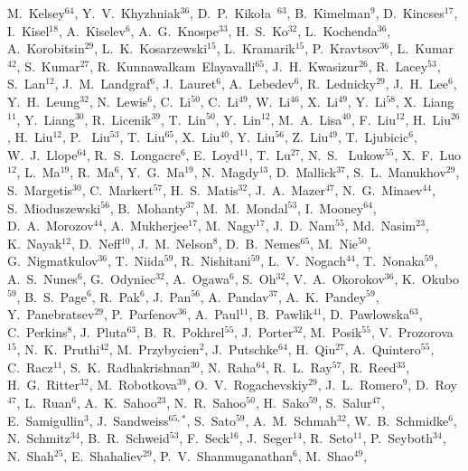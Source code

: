 {M.~Kelsey$^{64}$,
Y.~V.~Khyzhniak$^{36}$,
D.~P.~Kiko\l{}a~$^{63}$,
B.~Kimelman$^{9}$,
D.~Kincses$^{17}$,
I.~Kisel$^{18}$,
A.~Kiselev$^{6}$,
A.~G.~Knospe$^{33}$,
H.~S.~Ko$^{32}$,
L.~Kochenda$^{36}$,
A.~Korobitsin$^{29}$,
L.~K.~Kosarzewski$^{15}$,
L.~Kramarik$^{15}$,
P.~Kravtsov$^{36}$,
L.~Kumar$^{42}$,
S.~Kumar$^{27}$,
R.~Kunnawalkam~Elayavalli$^{65}$,
J.~H.~Kwasizur$^{26}$,
R.~Lacey$^{53}$,
S.~Lan$^{12}$,
J.~M.~Landgraf$^{6}$,
J.~Lauret$^{6}$,
A.~Lebedev$^{6}$,
R.~Lednicky$^{29}$,
J.~H.~Lee$^{6}$,
Y.~H.~Leung$^{32}$,
N.~Lewis$^{6}$,
C.~Li$^{50}$,
C.~Li$^{49}$,
W.~Li$^{46}$,
X.~Li$^{49}$,
Y.~Li$^{58}$,
X.~Liang$^{11}$,
Y.~Liang$^{30}$,
R.~Licenik$^{39}$,
T.~Lin$^{50}$,
Y.~Lin$^{12}$,
M.~A.~Lisa$^{40}$,
F.~Liu$^{12}$,
H.~Liu$^{26}$,
H.~Liu$^{12}$,
P.~ Liu$^{53}$,
T.~Liu$^{65}$,
X.~Liu$^{40}$,
Y.~Liu$^{56}$,
Z.~Liu$^{49}$,
T.~Ljubicic$^{6}$,
W.~J.~Llope$^{64}$,
R.~S.~Longacre$^{6}$,
E.~Loyd$^{11}$,
T.~Lu$^{27}$,
N.~S.~ Lukow$^{55}$,
X.~F.~Luo$^{12}$,
L.~Ma$^{19}$,
R.~Ma$^{6}$,
Y.~G.~Ma$^{19}$,
N.~Magdy$^{13}$,
D.~Mallick$^{37}$,
S.~L.~Manukhov$^{29}$,
S.~Margetis$^{30}$,
C.~Markert$^{57}$,
H.~S.~Matis$^{32}$,
J.~A.~Mazer$^{47}$,
N.~G.~Minaev$^{44}$,
S.~Mioduszewski$^{56}$,
B.~Mohanty$^{37}$,
M.~M.~Mondal$^{53}$,
I.~Mooney$^{64}$,
D.~A.~Morozov$^{44}$,
A.~Mukherjee$^{17}$,
M.~Nagy$^{17}$,
J.~D.~Nam$^{55}$,
Md.~Nasim$^{23}$,
K.~Nayak$^{12}$,
D.~Neff$^{10}$,
J.~M.~Nelson$^{8}$,
D.~B.~Nemes$^{65}$,
M.~Nie$^{50}$,
G.~Nigmatkulov$^{36}$,
T.~Niida$^{59}$,
R.~Nishitani$^{59}$,
L.~V.~Nogach$^{44}$,
T.~Nonaka$^{59}$,
A.~S.~Nunes$^{6}$,
G.~Odyniec$^{32}$,
A.~Ogawa$^{6}$,
S.~Oh$^{32}$,
V.~A.~Okorokov$^{36}$,
K.~Okubo$^{59}$,
B.~S.~Page$^{6}$,
R.~Pak$^{6}$,
J.~Pan$^{56}$,
A.~Pandav$^{37}$,
A.~K.~Pandey$^{59}$,
Y.~Panebratsev$^{29}$,
P.~Parfenov$^{36}$,
A.~Paul$^{11}$,
B.~Pawlik$^{41}$,
D.~Pawlowska$^{63}$,
C.~Perkins$^{8}$,
J.~Pluta$^{63}$,
B.~R.~Pokhrel$^{55}$,
J.~Porter$^{32}$,
M.~Posik$^{55}$,
V.~Prozorova$^{15}$,
N.~K.~Pruthi$^{42}$,
M.~Przybycien$^{2}$,
J.~Putschke$^{64}$,
H.~Qiu$^{27}$,
A.~Quintero$^{55}$,
C.~Racz$^{11}$,
S.~K.~Radhakrishnan$^{30}$,
N.~Raha$^{64}$,
R.~L.~Ray$^{57}$,
R.~Reed$^{33}$,
H.~G.~Ritter$^{32}$,
M.~Robotkova$^{39}$,
O.~V.~Rogachevskiy$^{29}$,
J.~L.~Romero$^{9}$,
D.~Roy$^{47}$,
L.~Ruan$^{6}$,
A.~K.~Sahoo$^{23}$,
N.~R.~Sahoo$^{50}$,
H.~Sako$^{59}$,
S.~Salur$^{47}$,
E.~Samigullin$^{3}$,
J.~Sandweiss$^{65,*}$,
S.~Sato$^{59}$,
A.~M.~Schmah$^{32}$,
W.~B.~Schmidke$^{6}$,
N.~Schmitz$^{34}$,
B.~R.~Schweid$^{53}$,
F.~Seck$^{16}$,
J.~Seger$^{14}$,
R.~Seto$^{11}$,
P.~Seyboth$^{34}$,
N.~Shah$^{25}$,
E.~Shahaliev$^{29}$,
P.~V.~Shanmuganathan$^{6}$,
M.~Shao$^{49}$,
}
